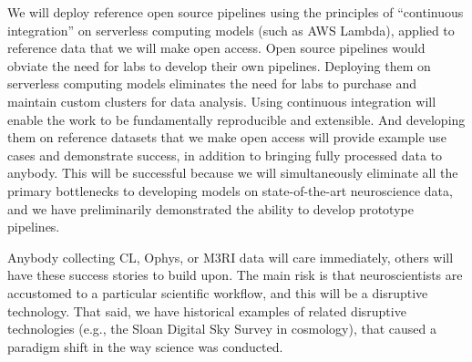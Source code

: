 We will deploy reference open source pipelines using the principles of ``continuous integration'' on serverless computing models (such as AWS Lambda), applied to reference data that we will make open access. Open source pipelines  would obviate the need for  labs to develop their own pipelines.  Deploying them on serverless computing models eliminates the need for labs to purchase and maintain custom clusters for data analysis.  Using continuous integration will enable the work to be fundamentally reproducible and extensible.  And developing them on reference datasets that we make open access will provide example use cases and demonstrate success, in addition to bringing fully processed data to anybody.
% 
This will be successful because we will simultaneously eliminate all the primary bottlenecks to developing models on state-of-the-art neuroscience data, and we have preliminarily demonstrated the ability to develop prototype pipelines.









Anybody collecting CL, Ophys, or M3RI data will care immediately, others will have these success stories to build upon.  
% 
% 
The main risk is that neuroscientists are accustomed to a particular scientific workflow, and this will be a disruptive technology.  That said, we have historical examples of related disruptive technologies (e.g., the Sloan Digital Sky Survey in cosmology), that caused a paradigm shift in the way science was conducted.  


